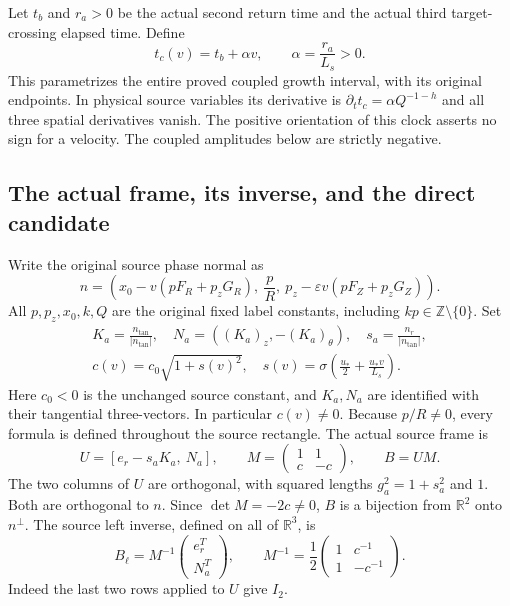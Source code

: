 Let $t_b$ and $r_a>0$ be the actual second return time and the actual
third target-crossing elapsed time. Define
\begin{equation}\label{tgframe:coupledclock}
 t_c(v)=t_b+\alpha v,\qquad \alpha=\frac{r_a}{L_s}>0.
\end{equation}
This parametrizes the entire proved coupled growth interval, with its
original endpoints. In physical source variables its derivative is
$\partial_tt_c=\alpha Q^{-1-h}$ and all three spatial derivatives vanish.
The positive orientation of this clock asserts no sign for a velocity.
The coupled amplitudes below are strictly negative.

\subsection{The actual frame, its inverse, and the direct candidate}

Write the original source phase normal as
\[
 n=\left(x_0-v(pF_R+p_zG_R),\ \frac pR,\
             p_z-\varepsilon v(pF_Z+p_zG_Z)\right).
\]
All $p,p_z,x_0,k,Q$ are the original fixed label constants, including
$kp\in\mathbb Z\setminus\{0\}$. Set
\[
\begin{gathered}
 K_a=\frac{n_{\tan}}{|n_{\tan}|},\quad
 N_a=((K_a)_z,-(K_a)_\theta),\quad
 s_a=\frac{n_r}{|n_{\tan}|},\\
 c(v)=c_0\sqrt{1+s(v)^2},
 \quad
 s(v)=\sigma\left(\frac{u_*}{2}+\frac{u_*v}{L_s}\right).
\end{gathered}
\]
Here $c_0<0$ is the unchanged source constant, and $K_a,N_a$
are identified with their tangential three-vectors. In particular
$c(v)\ne0$. Because $p/R\ne0$, every formula is defined throughout
the source rectangle. The actual source frame is
\[
 U=[e_r-s_aK_a,\ N_a],\qquad
 M=\begin{pmatrix}1&1\\c&-c\end{pmatrix},\qquad B=UM.
\]
The two columns of $U$ are orthogonal, with squared lengths
$g_a^2=1+s_a^2$ and $1$. Both are orthogonal to $n$.
Since $\det M=-2c\ne0$, $B$ is a bijection from $\mathbb R^2$
onto $n^\perp$. The source left inverse, defined on all of
$\mathbb R^3$, is
\begin{equation}\label{tgframe:leftinverse}
 B_\ell=M^{-1}\begin{pmatrix}e_r^T\\N_a^T\end{pmatrix},
 \qquad
 M^{-1}=\frac12\begin{pmatrix}1&c^{-1}\\1&-c^{-1}\end{pmatrix}.
\end{equation}
Indeed the last two rows applied to $U$ give $I_2$.

